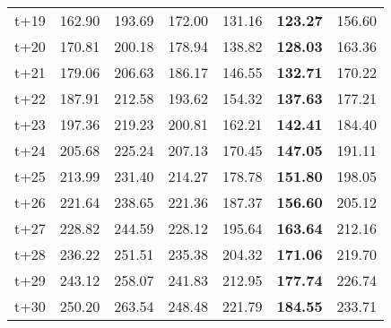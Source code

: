\begin{table}[H]
\begin{tabular}{lrrrrrr}
t+19  & 162.90  & 193.69  & 172.00  & 131.16  & \textbf{123.27}  & 156.60  \\
t+20  & 170.81  & 200.18  & 178.94  & 138.82  & \textbf{128.03}  & 163.36  \\
t+21  & 179.06  & 206.63  & 186.17  & 146.55  & \textbf{132.71}  & 170.22  \\
t+22  & 187.91  & 212.58  & 193.62  & 154.32  & \textbf{137.63}  & 177.21  \\
t+23  & 197.36  & 219.23  & 200.81  & 162.21  & \textbf{142.41}  & 184.40  \\
t+24  & 205.68  & 225.24  & 207.13  & 170.45  & \textbf{147.05}  & 191.11  \\
t+25  & 213.99  & 231.40  & 214.27  & 178.78  & \textbf{151.80}  & 198.05  \\
t+26  & 221.64  & 238.65  & 221.36  & 187.37  & \textbf{156.60}  & 205.12  \\
t+27  & 228.82  & 244.59  & 228.12  & 195.64  & \textbf{163.64}  & 212.16  \\
t+28  & 236.22  & 251.51  & 235.38  & 204.32  & \textbf{171.06}  & 219.70  \\
t+29  & 243.12  & 258.07  & 241.83  & 212.95  & \textbf{177.74}  & 226.74  \\
t+30  & 250.20  & 263.54  & 248.48  & 221.79  & \textbf{184.55}  & 233.71  \\

\bottomrule
\end{tabular}
\end{table}
